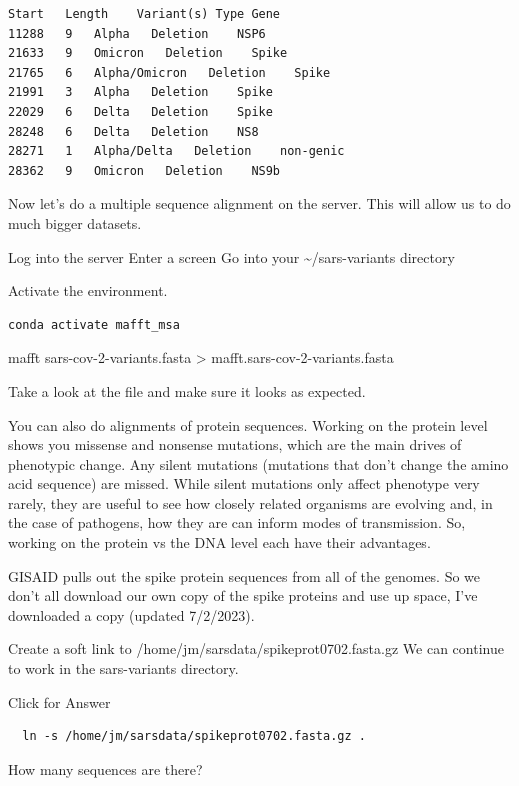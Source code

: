 \documentclass[
]{book}
\begin{document}
\begin{verbatim}
Start   Length    Variant(s) Type Gene
11288   9   Alpha   Deletion    NSP6
21633   9   Omicron   Deletion    Spike
21765   6   Alpha/Omicron   Deletion    Spike
21991   3   Alpha   Deletion    Spike
22029   6   Delta   Deletion    Spike
28248   6   Delta   Deletion    NS8
28271   1   Alpha/Delta   Deletion    non-genic
28362   9   Omicron   Deletion    NS9b
\end{verbatim}

\hfill\break

Now let's do a multiple sequence alignment on the server. This will allow us to do much bigger datasets.

Log into the server
Enter a screen
Go into your \textasciitilde/sars-variants directory

Activate the environment.

\begin{verbatim}
conda activate mafft_msa
\end{verbatim}

mafft sars-cov-2-variants.fasta \textgreater{} mafft.sars-cov-2-variants.fasta

Take a look at the file and make sure it looks as expected.

You can also do alignments of protein sequences. Working on the protein level shows you missense and nonsense mutations, which are the main drives of phenotypic change. Any silent mutations (mutations that don't change the amino acid sequence) are missed. While silent mutations only affect phenotype very rarely, they are useful to see how closely related organisms are evolving and, in the case of pathogens, how they are can inform modes of transmission. So, working on the protein vs the DNA level each have their advantages.

GISAID pulls out the spike protein sequences from all of the genomes. So we don't all download our own copy of the spike proteins and use up space, I've downloaded a copy (updated 7/2/2023).

Create a soft link to /home/jm/sarsdata/spikeprot0702.fasta.gz
We can continue to work in the sars-variants directory.

Click for Answer

\begin{verbatim}
  ln -s /home/jm/sarsdata/spikeprot0702.fasta.gz .
\end{verbatim}

\hfill\break

How many sequences are there?
\end{document}
